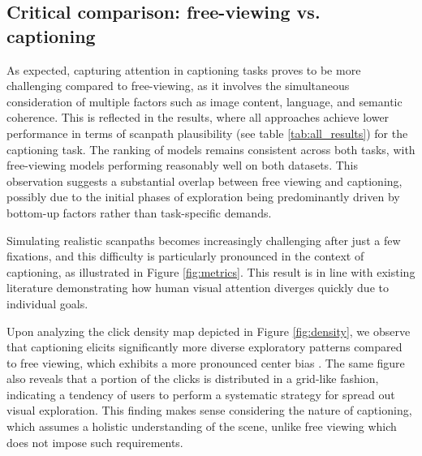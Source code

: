 \documentclass{article}
\begin{document}
\subsection{Critical comparison: free-viewing vs. captioning} \label{sec:captioningVSfreeviewing}

As expected, capturing attention in captioning tasks proves to be more challenging compared to free-viewing, as it involves the simultaneous consideration of multiple factors such as image content, language, and semantic coherence. This is reflected in the results, where all approaches achieve lower performance in terms of scanpath plausibility (see table \ref{tab:all_results}) for the captioning task. The ranking of models remains consistent across both tasks, with free-viewing models performing reasonably well on both datasets. This observation suggests a substantial overlap between free viewing and captioning, possibly due to the initial phases of exploration being predominantly driven by bottom-up factors rather than task-specific demands.

Simulating realistic scanpaths becomes increasingly challenging after just a few fixations, and this difficulty is particularly pronounced in the context of captioning, as illustrated in Figure \ref{fig:metrics}. This result is in line with existing literature \citep{tatler2005visual} demonstrating how human visual attention diverges quickly due to individual goals.

Upon analyzing the click density map depicted in Figure \ref{fig:density}, we observe that captioning elicits significantly more diverse exploratory patterns compared to free viewing, which exhibits a more pronounced center bias \citep{judd2009learning}. The same figure also reveals that a portion of the clicks is distributed in a grid-like fashion, indicating a tendency of users to perform a systematic  strategy for spread out visual exploration. This finding makes sense considering the nature of captioning, which assumes a holistic understanding of the scene, unlike free viewing which does not impose such requirements. 
\end{document}
